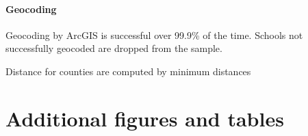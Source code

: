 \documentclass[11pt]{article}
\begin{document}
\paragraph{Geocoding}

Geocoding by ArcGIS is successful over 99.9\% of the time. Schools not successfully geocoded are dropped from the sample.

Distance for counties are computed by minimum distances




\clearpage

\section{Additional figures and tables}











\end{document}
